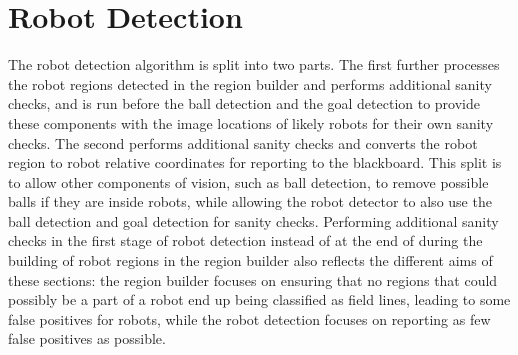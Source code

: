 \documentclass[pdftex,11pt,a4paper]{report}
\begin{document}
\section{Robot Detection}
The robot detection algorithm is split into two parts. The first further processes the robot regions detected in the region builder and performs additional sanity checks, and is run before the ball detection and the goal detection to provide these components with the image locations of likely robots for their own sanity checks. The second performs additional sanity checks and converts the robot region to robot relative coordinates for reporting to the blackboard. This split is to allow other components of vision, such as ball detection, to remove possible balls if they are inside robots, while allowing the robot detector to also use the ball detection and goal detection for sanity checks. Performing additional sanity checks in the first stage of robot detection instead of at the end of during the building of robot regions in the region builder also reflects the different aims of these sections: the region builder focuses on ensuring that no regions that could possibly be a part of a robot end up being classified as field lines, leading to some false positives for robots, while the robot detection focuses on reporting as few false positives as possible.
\end{document}
